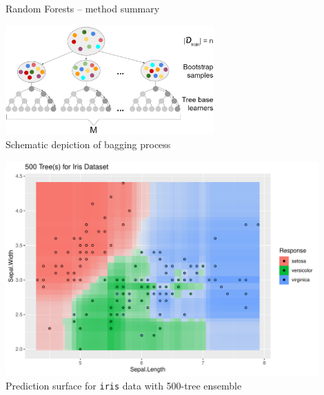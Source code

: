 \begin{frame}{Random Forests -- method summary}
\begin{minipage}[b]{0.65\textwidth}
  \centering
  \includegraphics[width=0.6\textwidth]{figure/rf-bagging} \\
  \tiny Schematic depiction of bagging process
\end{minipage}%
\begin{minipage}[b]{0.35\textwidth}
\centering
  \includegraphics[width=0.9\textwidth]{
  ../slides/forests/figure/cart_forest_intro_3} \\
  \tiny Prediction surface for \texttt{iris} data with 500-tree ensemble
\end{minipage}

\end{frame}


